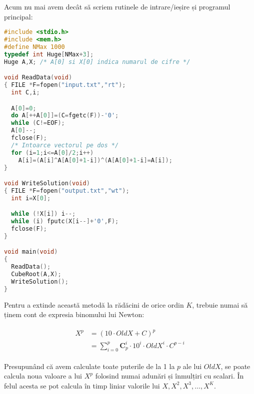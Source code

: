 Acum nu mai avem decât să scriem rutinele de intrare/ieșire și programul
principal:

\begin{lstlisting}[language=C]
#include <stdio.h>
#include <mem.h>
#define NMax 1000
typedef int Huge[NMax+3];
Huge A,X; /* A[0] si X[0] indica numarul de cifre */

void ReadData(void)
{ FILE *F=fopen("input.txt","rt");
  int C,i;

  A[0]=0;
  do A[++A[0]]=(C=fgetc(F))-'0';
  while (C!=EOF);
  A[0]--;
  fclose(F);
  /* Intoarce vectorul pe dos */
  for (i=1;i<=A[0]/2;i++)
    A[i]=(A[i]^A[A[0]+1-i])^(A[A[0]+1-i]=A[i]);
}

void WriteSolution(void)
{ FILE *F=fopen("output.txt","wt");
  int i=X[0];

  while (!X[i]) i--;
  while (i) fputc(X[i--]+'0',F);
  fclose(F);
}

void main(void)
{
  ReadData();
  CubeRoot(A,X);
  WriteSolution();
}
\end{lstlisting}

Pentru a extinde această metodă la rădăcini de orice ordin $K$, trebuie numai
să ținem cont de expresia binomului lui Newton:

\begin{align}
  \begin{split}
    X^p & = (10 \cdot OldX + C)^p \\
    & = \sum_{i=0}^{p} \mathbf{C}_p^i \cdot 10^i \cdot OldX^i \cdot C^{p-i}
  \end{split}
\end{align}

Presupunând că avem calculate toate puterile de la 1 la $p$ ale lui $OldX$, se
poate calcula noua valoare a lui $X^p$ folosind numai adunări și înmulțiri cu
scalari. În felul acesta se pot calcula în timp liniar valorile lui $X, X^2,
X^3, \dots, X^K.$
